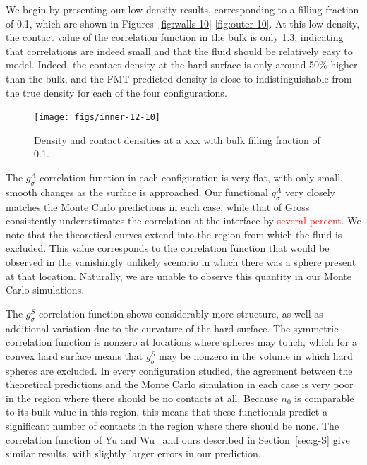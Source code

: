 \documentclass[letterpaper,twocolumn,amsmath,amssymb,jcp,10pt,aip]{revtex4-1}
\begin{document}
We begin by presenting our low-density results, corresponding to a
filling fraction of 0.1, which are shown in
Figures~\ref{fig:walls-10}-\ref{fig:outer-10}.  At this low density,
the contact value of the correlation function in the bulk is only 1.3,
indicating that correlations are indeed small and that the fluid should be
relatively easy to model.  Indeed, the contact density at the hard
surface is only around 50\% higher than the bulk, and the FMT
predicted density is close to indistinguishable from the true
density for each of the four configurations.

\begin{figure}
  \texttt{[image: figs/inner-12-10]}
  \caption{Density and contact densities at a xxx with bulk filling
    fraction of 0.1.}
  \label{fig:inner-12-10}
\end{figure}

The $g_\sigma^A$ correlation function in each configuration is very
flat, with only small, smooth changes as the surface is approached.
Our functional $g_\sigma^A$ very closely matches the Monte Carlo
predictions in each case, while that of Gross consistently
underestimates the correlation at the interface by
\textcolor{red}{several percent}.  We note that the theoretical curves
extend into the region from which the fluid is excluded.  This value
corresponds to the correlation function that would be observed in the
vanishingly unlikely scenario in which there was a sphere present at
that location.  Naturally, we are unable to observe this quantity in
our Monte Carlo simulations.

The $g_\sigma^S$ correlation function shows considerably more
structure, as well as additional variation due to the curvature of the
hard surface.  The symmetric correlation function is nonzero at
locations where spheres may touch, which for a convex hard surface
means that $g_\sigma^S$ may be nonzero in the volume in which hard
spheres are excluded.  In every configuration studied, the agreement
between the theoretical predictions and the Monte Carlo simulation in
each case is very poor in the region where there should be no contacts
at all.  Because $n_0$ is comparable to its bulk value in this region,
this means that these functionals predict a significant number of
contacts in the region where there should be none.  The correlation
function of Yu and Wu~\cite{yu2002fmt-dft-inhomogeneous-associating}
and ours described in Section~\ref{sec:g-S} give similar results, with
slightly larger errors in our prediction.
\end{document}
